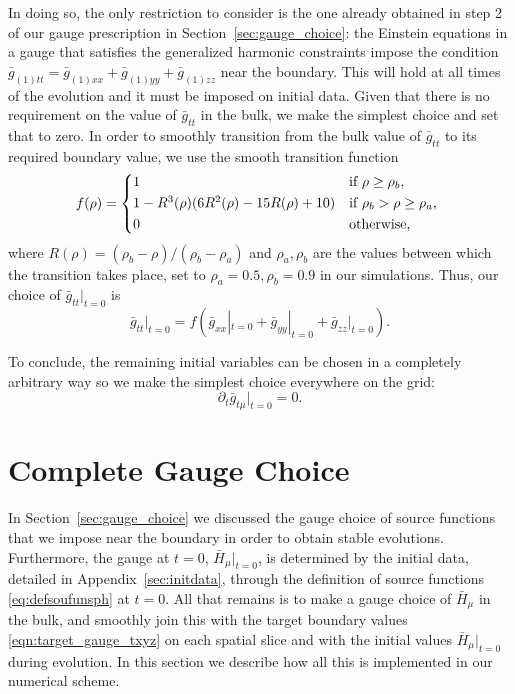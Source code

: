 \documentclass[a4paper,11pt]{article}
\numberwithin{equation}{section}
\begin{document}
In doing so, the only restriction to consider is the one already obtained in step 2 of our gauge prescription in Section~\ref{sec:gauge_choice}: the Einstein equations in a gauge that satisfies the generalized harmonic constraints impose the condition $\bar{g}_{(1)tt}=\bar{g}_{(1)xx}+\bar{g}_{(1)yy}+\bar{g}_{(1)zz}$ near the boundary. This will hold at all times of  the evolution and it must be imposed on initial data. Given that there is no requirement on the value of $\bar{g}_{tt}$ in the bulk, we make the simplest choice and set that to zero. In order to smoothly transition from the bulk value of $\bar{g}_{tt}$ to its required boundary value, we use the smooth transition function
  \begin{equation}
  \label{eq:transfunc}
    f(\rho) =
    \begin{cases*}
      1 & if $\rho\geq \rho_{b}$, \\
      1-R^3(\rho)(6 R^2(\rho)-15 R(\rho)+10) & if $\rho_{b} > \rho\geq\rho_{a}$, \\
      0        & otherwise,
    \end{cases*}
  \end{equation}
where $R(\rho)=(\rho_{b}-\rho)/(\rho_{b}-\rho_{a})$ and $\rho_{a},\rho_{b}$ are the values between which the transition takes place, set to $\rho_{a}=0.5,\rho_{b}=0.9$ in our simulations.
Thus, our choice of $\bar{g}_{tt}|_{t=0}$ is
\begin{equation}
\bar{g}_{tt}\big|_{t=0}=f(\bar{g}_{xx}|_{t=0}+\bar{g}_{yy}|_{t=0}+\bar{g}_{zz}|_{t=0}).
\end{equation}

To conclude, the remaining initial variables can be chosen in a completely arbitrary way so we make the simplest choice everywhere on the grid:
\begin{equation}
\partial_t\bar{g}_{t \mu}|_{t=0}=0.
\end{equation}

\section{Complete Gauge Choice}
\label{sec:GCbulk}

In Section~\ref{sec:gauge_choice} we discussed the gauge choice of source functions that we impose near the boundary in order to obtain stable evolutions. Furthermore, the gauge at $t=0$, $\bar{H}_{\mu}|_{t=0}$, is determined by the initial data, detailed in Appendix~\ref{sec:initdata}, through the definition of source functions \eqref{eq:defsoufunsph} at $t=0$. All that remains is to make a gauge choice of $\bar{H}_\mu$ in the bulk, and smoothly join this with the target boundary values \eqref{eqn:target_gauge_txyz} on each spatial slice and with the initial values $\bar{H}_{\mu}|_{t=0}$ during evolution. In this section we describe how all this is implemented in our numerical scheme.
\end{document}
